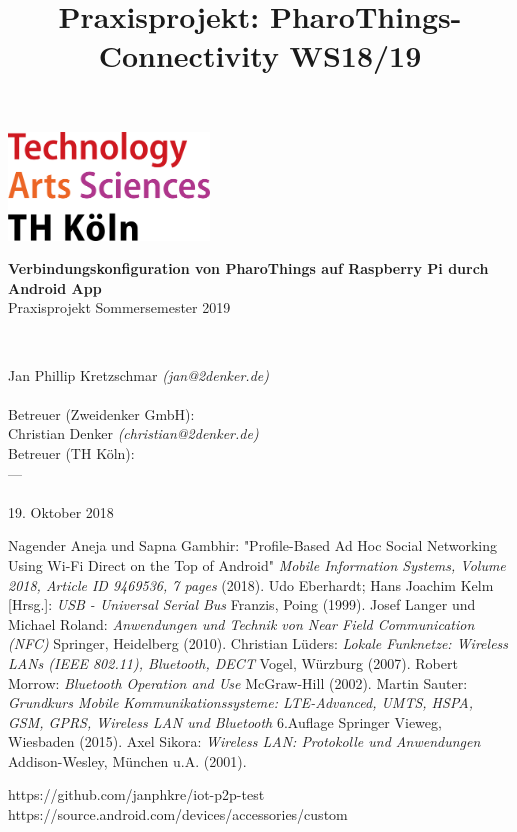 \documentclass[12pt,a4paper]{article}
\title{Praxisprojekt: PharoThings-Connectivity WS18/19}
\begin{document}
	\begin{titlepage}
    \includegraphics[width=0.4\textwidth]{th_logo.png}
    ~\\[2.5cm]
    \begin{center}
    \textbf{\huge Verbindungskonfiguration von PharoThings auf Raspberry Pi durch Android App}\\[0.5cm]
    {\Large Praxisprojekt Sommersemester 2019}
    \vfill
    \end{center}
    ~\\[2.0cm]
    \begin{flushright}
    {\large Jan Phillip Kretzschmar \it{(jan@2denker.de)}}\\[0.1cm]
    ~\\[1.0cm]
    {\large Betreuer (Zweidenker GmbH):}\\[0.1cm]
    {\large Christian Denker \it{(christian@2denker.de)}}
    ~\\[0.5cm]
    {\large Betreuer (TH Köln):}\\[0.1cm]
    {\large ---}\\[0.1cm]

	~\\[1.0cm]
    {\large 19. Oktober 2018}
	\end{flushright}
    \end{titlepage}
    
    \pagebreak
        
    

    \begin{thebibliography}{10}
        Nagender Aneja und Sapna Gambhir: "Profile-Based Ad Hoc Social Networking Using Wi-Fi Direct on the Top of Android" {\it Mobile Information Systems, Volume 2018, Article ID 9469536, 7 pages} (2018).
         Udo Eberhardt; Hans Joachim Kelm [Hrsg.]: {\it USB - Universal Serial Bus} Franzis, Poing (1999).
        Josef Langer und Michael Roland: {\it Anwendungen und Technik von Near Field Communication (NFC)} Springer, Heidelberg (2010).
        Christian Lüders: {\it Lokale Funknetze: Wireless LANs (IEEE 802.11), Bluetooth, DECT} Vogel, Würzburg (2007).
        Robert Morrow: {\it Bluetooth Operation and Use} McGraw-Hill (2002).
        Martin Sauter: {\it Grundkurs Mobile Kommunikationssysteme: LTE-Advanced, UMTS, HSPA, GSM, GPRS, Wireless LAN und Bluetooth} 6.Auflage Springer Vieweg, Wiesbaden (2015).
        Axel Sikora: {\it Wireless LAN: Protokolle und Anwendungen} Addison-Wesley, München u.A. (2001).

        https://github.com/janphkre/iot-p2p-test
        https://source.android.com/devices/accessories/custom
    \end{thebibliography}
\end{document}
